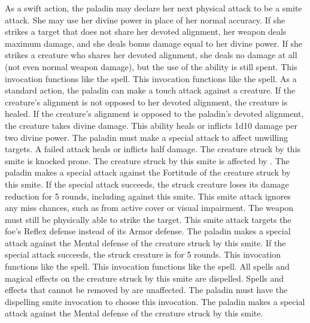 As a swift action, the paladin may declare her next physical attack to be a smite attack.
She may use her divine power in place of her normal accuracy.
If she strikes a target that does not share her devoted alignment, her weapon deals maximum damage, and she deals bonus damage equal to her divine power.
If she strikes a creature who shares her devoted alignment, she deals no damage at all (not even normal weapon damage), but the use of the ability is still spent.
 This invocation functions like the  spell.
 This invocation functions like the  spell.
As a standard action, the paladin can make a touch attack against a creature.
If the creature's alignment is not opposed to her devoted alignment, the creature is healed.
If the creature's alignment is opposed to the paladin's devoted alignment, the creature takes divine damage.
This ability heals or inflicts 1d10 damage per two divine power.
The paladin must make a special attack to affect unwilling targets.
A failed attack heals or inflicts half damage.
The creature struck by this smite is knocked prone.
The creature struck by this smite is affected by .
The paladin makes a special attack against the Fortitude of the creature struck by this smite.
If the special attack succeeds, the struck creature loses its damage reduction for 5 rounds, including against this smite.
This smite attack ignores any miss chances, such as from active cover or visual impairment.
The weapon must still be physically able to strike the target.
This smite attack targets the foe's Reflex defense instead of its Armor defense.
The paladin makes a special attack against the Mental defense of the creature struck by this smite.
If the special attack succeeds, the struck creature is \dazed for 5 rounds.
 This invocation functions like the  spell.
 This invocation functions like the  spell.
All spells and magical effects on the creature struck by this smite are dispelled.
Spells and effects that cannot be removed by  are unaffected.
The paladin must have the dispelling smite invocation to choose this invocation.
The paladin makes a special attack against the Mental defense of the creature struck by this smite.
